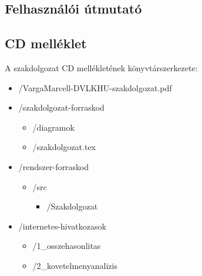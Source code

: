 \documentclass[a4paper,12pt,oneside]{report}
\begin{document}
\subsection{Felhasználói útmutató}

\subsection{CD melléklet}
A szakdolgozat CD mellékletének könyvtárszerkezete:

\begin{itemize}
    \item[] /VargaMarcell-DVLKHU-szakdolgozat.pdf
    \item[] /szakdolgozat-forraskod
    \begin{itemize}
        \item[] /diagramok
        \item[] /szakdolgozat.tex
    \end{itemize}
    
    \item[] /rendszer-forraskod
    \begin{itemize}
        \item[] /src
        \begin{itemize}
            \item[] /Szakdolgozat
        \end{itemize}
        
    \end{itemize}
    
    \item[] /internetes-hivatkozasok
    \begin{itemize}
        \item[] /1\_osszehasonlitas
        \item[] /2\_kovetelmenyanalizis
    \end{itemize}
\end{itemize}
\end{document}
